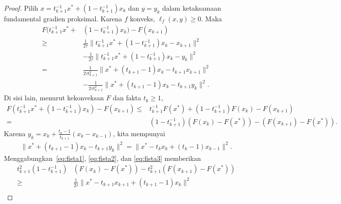 \begin{proof}
    Pilih \(x=t_{k+1}^{-1}x^*+(1-t_{k+1}^{-1})x_k\) dan \(y=y_k\) dalam ketaksamaan fundamental gradien proksimal. Karena \(f\) konveks, \(\ell_f(x,y)\geq0\). Maka
    \begin{equation}\label{eq:fista1}
        \begin{aligned}
            F(t_{k+1}^{-1}x^*+&(1-t_{k+1}^{-1})x_k)-F(x_{k+1})\\
            \geq{}&
            \frac{1}{2\tau}
            \|t_{k+1}^{-1}x^*+(1-t_{k+1}^{-1})x_k-x_{k+1}\|^2\\
            &-\frac{1}{2\tau}
            \|t_{k+1}^{-1}x^*+(1-t_{k+1}^{-1})x_k-y_k\|^2\\
            ={}&
            \frac{1}{2\tau t_{k+1}^2}
            \|x^*+(t_{k+1}-1)x_k-t_{k+1}x_{k+1}\|^2\\
            &-\frac{1}{2\tau t_{k+1}^2}
            \|x^*+(t_{k+1}-1)x_k-t_{k+1}y_k\|^2.
        \end{aligned}
    \end{equation}
    Di sisi lain, menurut kekonveksan \(F\) dan fakta \(t_k\geq1\),
    \begin{equation}\label{eq:fista2}
        \begin{aligned}
            F(t_{k+1}^{-1}x^*+(1-t_{k+1}^{-1})x_k)-F(x_{k+1})
            \leq{}&t_{k+1}^{-1}F(x^*)
            +(1-t_{k+1}^{-1})F(x_k)-F(x_{k+1})\\
            ={}&(1-t_{k+1}^{-1})(F(x_k)-F(x^*))
            -(F(x_{k+1})-F(x^*)).
        \end{aligned}
    \end{equation}
    Karena \(y_k=x_k+\frac{t_k-1}{t_{k+1}}(x_k-x_{k-1})\), kita mempunyai
    \begin{equation}\label{eq:fista3}
        \begin{aligned}
            \|x^*+(t_{k+1}-1)x_k-t_{k+1}y_k\|^2
            =\|x^*-t_kx_k+(t_k-1)x_{k-1}\|^2.
        \end{aligned}
    \end{equation}
    Menggabungkan~\eqref{eq:fista1}, \eqref{eq:fista2}, dan \eqref{eq:fista3} memberikan
    \begin{equation}
        \begin{aligned}
            t_{k+1}^2(1-t_{k+1}^{-1})
            &(F(x_k)-F(x^*))
            -t_{k+1}^2(F(x_{k+1})-F(x^*))\\
            \geq{}&
            \frac{1}{2\tau}
            \|x^*-t_{k+1}x_{k+1}+(t_{k+1}-1)x_k\|^2\\

\end{aligned}
\end{equation}
\end{proof}
